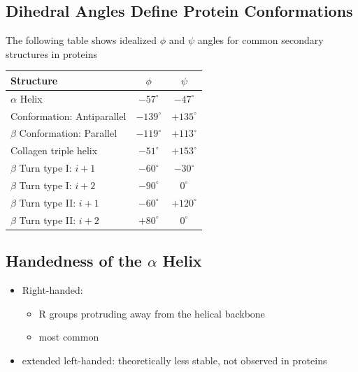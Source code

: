 \documentclass[10pt]{article}
\begin{document}
\subsection*{Dihedral Angles Define Protein Conformations}
The following table shows idealized $\phi$ and $\psi$ angles for common secondary structures in proteins
\begin{center}
\begin{tabular}{lcc}
\rowcolor[HTML]{D0E7D2} 
\textbf{Structure}                                    & $\phi$                            & $\psi$                            \\ \hline
\multicolumn{1}{|l|}{$\alpha$ Helix}                  & \multicolumn{1}{c|}{$-57^\circ$}  & \multicolumn{1}{c|}{$-47^\circ$}  \\ \hline
\multicolumn{1}{|l|}{Conformation: Antiparallel}      & \multicolumn{1}{c|}{$-139^\circ$} & \multicolumn{1}{c|}{$+135^\circ$} \\ \hline
\multicolumn{1}{|l|}{$\beta$ Conformation: Parallel}  & \multicolumn{1}{c|}{$-119^\circ$} & \multicolumn{1}{c|}{$+113^\circ$} \\ \hline
\multicolumn{1}{|l|}{Collagen triple helix}           & \multicolumn{1}{c|}{$-51^\circ$}  & \multicolumn{1}{c|}{$+153^\circ$} \\ \hline
\multicolumn{1}{|l|}{$\beta$ Turn type I: $i + 1$}    & \multicolumn{1}{c|}{$-60^\circ$}  & \multicolumn{1}{c|}{$-30^\circ$}  \\ \hline
\multicolumn{1}{|l|}{$\beta$ Turn type I: $i + 2$}    & \multicolumn{1}{c|}{$-90^\circ$}  & \multicolumn{1}{c|}{$0^\circ$}    \\ \hline
\multicolumn{1}{|l|}{$\beta$ Turn type II: $i + 1$}   & \multicolumn{1}{c|}{$-60^\circ$}  & \multicolumn{1}{c|}{$+120^\circ$} \\ \hline
\multicolumn{1}{|l|}{$\beta$ Turn type II: $i + 2$}   & \multicolumn{1}{c|}{$+80^\circ$}  & \multicolumn{1}{c|}{$0^\circ$}    \\ \hline
\end{tabular}
\end{center}

\subsection*{Handedness of the $\alpha$ Helix}
\begin{itemize}
    \item Right-handed:
    \begin{itemize}
        \item R groups protruding away from the helical backbone
        \item most common
    \end{itemize}
    \item extended left-handed: theoretically less stable, not observed in proteins
\end{itemize}
\end{document}
